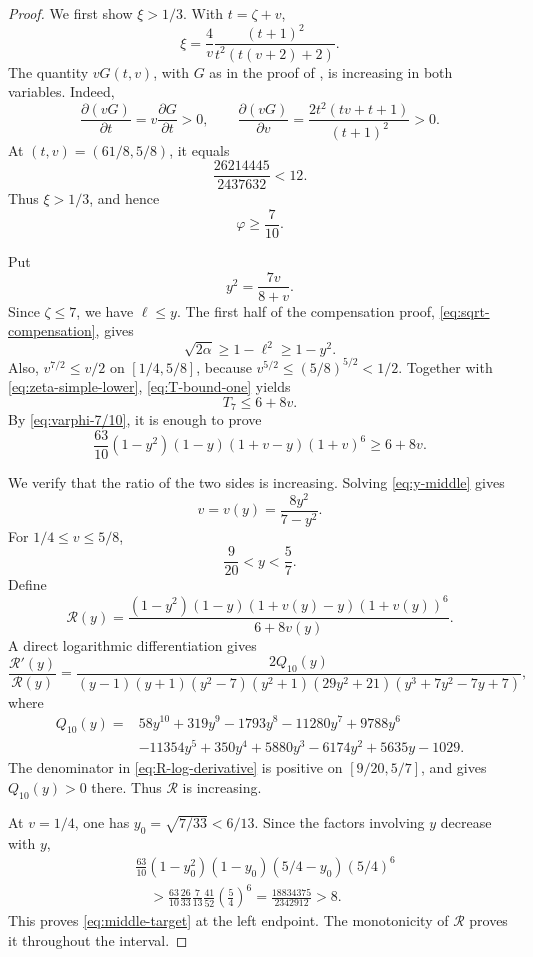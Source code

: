 \documentclass[11pt]{article}
\begin{document}
\begin{proof}
We first show \(\xi>1/3\).  With \(t=\zeta+v\),
\[
       \xi=\frac4v\frac{(t+1)^2}{t^2(t(v+2)+2)}.
\]
The quantity \(vG(t,v)\), with \(G\) as in the proof of
, is increasing in both variables.  Indeed,
\[
 \frac{\partial(vG)}{\partial t}=v\frac{\partial G}{\partial t}>0,
 \qquad
 \frac{\partial(vG)}{\partial v}
 =\frac{2t^2(tv+t+1)}{(t+1)^2}>0.
\]
At
\((t,v)=(61/8,5/8)\), it equals
\[
       \frac{26214445}{2437632}<12.
\]
Thus \(\xi>1/3\), and hence
\begin{equation}\label{eq:varphi-7/10}
       \varphi\ge\frac7{10}.
\end{equation}

Put
\begin{equation}\label{eq:y-middle}
       y^2=\frac{7v}{8+v}.
\end{equation}
Since \(\zeta\le7\), we have \(\ell\le y\).  The first half of the
compensation proof, \eqref{eq:sqrt-compensation}, gives
\[
       \sqrt{2\alpha}\ge1-\ell^2\ge1-y^2.
\]
Also, \(v^{7/2}\le v/2\) on \([1/4,5/8]\), because
\(v^{5/2}\le(5/8)^{5/2}<1/2\).  Together with
\eqref{eq:zeta-simple-lower}, \eqref{eq:T-bound-one} yields
\begin{equation}\label{eq:T7-middle}
       T_7\le6+8v.
\end{equation}
By \eqref{eq:varphi-7/10}, it is enough to prove
\begin{equation}\label{eq:middle-target}
 \frac{63}{10}(1-y^2)(1-y)(1+v-y)(1+v)^6
 \ge6+8v.
\end{equation}

We verify that the ratio of the two sides is increasing.  Solving
\eqref{eq:y-middle} gives
\[
       v=v(y)=\frac{8y^2}{7-y^2}.
\]
For \(1/4\le v\le5/8\),
\[
       \frac9{20}<y<\frac57.
\]
Define
\[
 \mathcal R(y)=
 \frac{(1-y^2)(1-y)(1+v(y)-y)(1+v(y))^6}
      {6+8v(y)}.
\]
A direct logarithmic differentiation gives
\begin{equation}\label{eq:R-log-derivative}
 \frac{\mathcal R'(y)}{\mathcal R(y)}
 =\frac{2Q_{10}(y)}
 {(y-1)(y+1)(y^2-7)(y^2+1)(29y^2+21)
  (y^3+7y^2-7y+7)},
\end{equation}
where
\begin{align}
 Q_{10}(y)={}&58y^{10}+319y^9-1793y^8-11280y^7+9788y^6\\
 &-11354y^5+350y^4+5880y^3-6174y^2+5635y-1029.
 \label{eq:Q10}
\end{align}
The denominator in \eqref{eq:R-log-derivative} is positive on
\([9/20,5/7]\), and  gives
\(Q_{10}(y)>0\) there.  Thus \(\mathcal R\) is increasing.

At \(v=1/4\), one has \(y_0=\sqrt{7/33}<6/13\).  Since the factors involving
\(y\) decrease with \(y\),
\begin{align*}
 &\frac{63}{10}(1-y_0^2)(1-y_0)(5/4-y_0)(5/4)^6\\
 &\quad>
 \frac{63}{10}\frac{26}{33}\frac7{13}\frac{41}{52}
 \left(\frac54\right)^6
 =\frac{18834375}{2342912}>8.
\end{align*}
This proves \eqref{eq:middle-target} at the left endpoint.  The monotonicity
of \(\mathcal R\) proves it throughout the interval.
\end{proof}
\end{document}
